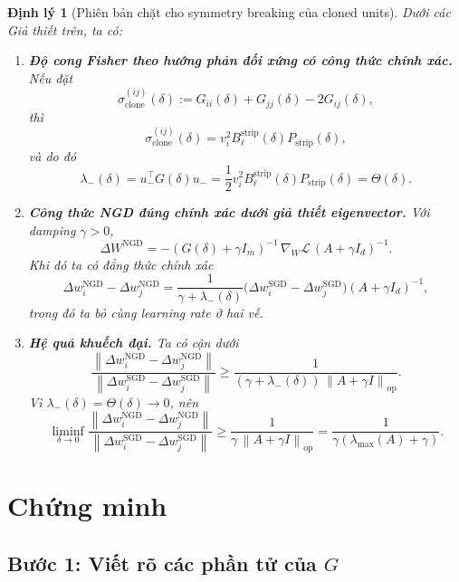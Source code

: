 \documentclass[11pt,a4paper]{article}
\newtheorem{theorem}{Định lý}
\newcommand{\cL}{\mathcal L}
\newcommand{\norm}[1]{\left\lVert #1 \right\rVert}
\DeclareMathOperator{\op}{op}
\begin{document}
\begin{theorem}[Phiên bản chặt cho symmetry breaking của cloned units]
\label{thm:clone_revised}
Dưới các Giả thiết trên, ta có:
\begin{enumerate}[label=(\roman*)]
    \item \textbf{Độ cong Fisher theo hướng phản đối xứng có công thức chính xác.}
    Nếu đặt
    \[
    \sigma_{\mathrm{clone}}^{(ij)}(\delta)
    :=
    G_{ii}(\delta) + G_{jj}(\delta) - 2G_{ij}(\delta),
    \]
    thì
    \[
    \sigma_{\mathrm{clone}}^{(ij)}(\delta)
    =
    v_i^2 B_\ell^{\mathrm{strip}}(\delta) P_{\mathrm{strip}}(\delta),
    \]
    và do đó
    \[
    \lambda_-(\delta) = u_-^\top G(\delta) u_-
    = \frac{1}{2} v_i^2 B_\ell^{\mathrm{strip}}(\delta) P_{\mathrm{strip}}(\delta)
    = \Theta(\delta).
    \]

    \item \textbf{Công thức NGD đúng chính xác dưới giả thiết eigenvector.}
    Với damping $\gamma > 0$,
    \[
    \Delta W^{\mathrm{NGD}}
    =
    -(G(\delta)+\gamma I_m)^{-1}\,\nabla_W \cL\,(A+\gamma I_d)^{-1}.
    \]
    Khi đó ta có đẳng thức chính xác
    \[
    \Delta w_i^{\mathrm{NGD}} - \Delta w_j^{\mathrm{NGD}}
    =
    \frac{1}{\gamma + \lambda_-(\delta)}
    \bigl(\Delta w_i^{\mathrm{SGD}} - \Delta w_j^{\mathrm{SGD}}\bigr)
    (A+\gamma I_d)^{-1},
    \]
    trong đó ta bỏ cùng learning rate ở hai vế.

    \item \textbf{Hệ quả khuếch đại.}
    Ta có cận dưới
    \[
    \frac{\norm{\Delta w_i^{\mathrm{NGD}} - \Delta w_j^{\mathrm{NGD}}}}
         {\norm{\Delta w_i^{\mathrm{SGD}} - \Delta w_j^{\mathrm{SGD}}}}
    \ge
    \frac{1}{(\gamma + \lambda_-(\delta))\,\norm{A+\gamma I}_{\op}}.
    \]
    Vì $\lambda_-(\delta)=\Theta(\delta) \to 0$, nên
    \[
    \liminf_{\delta \to 0}
    \frac{\norm{\Delta w_i^{\mathrm{NGD}} - \Delta w_j^{\mathrm{NGD}}}}
         {\norm{\Delta w_i^{\mathrm{SGD}} - \Delta w_j^{\mathrm{SGD}}}}
    \ge
    \frac{1}{\gamma\,\norm{A+\gamma I}_{\op}}
    =
    \frac{1}{\gamma(\lambda_{\max}(A)+\gamma)}.
    \]
\end{enumerate}
\end{theorem}

\section{Chứng minh}

\subsection*{Bước 1: Viết rõ các phần tử của $G$}
\end{document}
